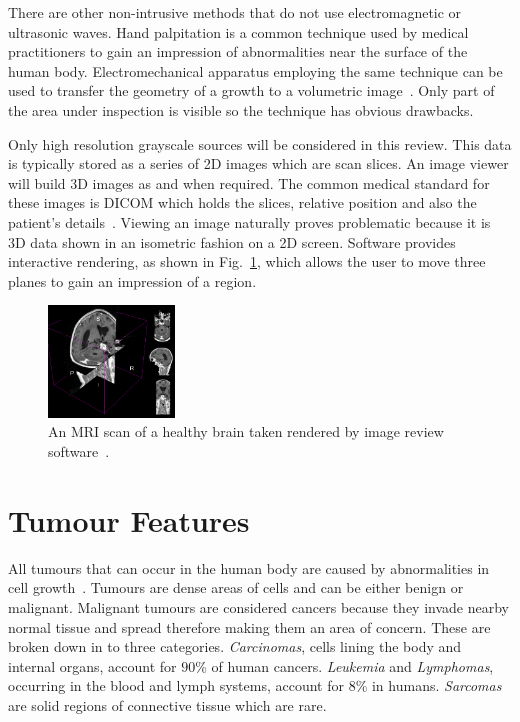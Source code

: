 \documentclass[journal]{IEEEtran}
\begin{document}
There are other non-intrusive methods that do not use electromagnetic or ultrasonic waves.
Hand palpitation is a common technique used by medical practitioners to gain an impression of abnormalities near the surface of the human body. 
Electromechanical apparatus employing the same technique can be used to transfer the geometry of a growth to a volumetric image~\cite{liu09haptic,wellman1997modeling}.  
Only part of the area under inspection is visible so the technique has obvious drawbacks.

Only high resolution grayscale sources will be considered in this review.
This data is typically stored as a series of 2D images which are scan slices.
An image viewer will build 3D images as and when required.
The common medical standard for these images is DICOM which holds the slices, relative position and also the patient's details~\cite{dicom11nema}.
Viewing an image naturally proves problematic because it is 3D data shown in an isometric fashion on a 2D screen.
Software provides interactive rendering, as shown in Fig.~\ref{fig:3d}, which allows the user to move three planes to gain an impression of a region.

\begin{figure}[!htb]
   \centering
   \includegraphics[width = 0.3\textwidth]{Figures/3Dview.png}
   \caption{An MRI scan of a healthy brain taken rendered by image review software~\cite{cia,slicer}.}
   \label{fig:3d}
\end{figure}












\section{Tumour Features}
\label{sec:tumour}

All tumours that can occur in the human body are caused by abnormalities in cell growth~\cite{cooper1992cancer}.
Tumours are dense areas of cells and can be either benign or malignant.
Malignant tumours are considered cancers because they invade nearby normal tissue and spread therefore making them an area of concern.
These are broken down in to three categories.
\emph{Carcinomas}, cells lining the body and internal organs, account for $90$\% of human cancers.
\emph{Leukemia} and \emph{Lymphomas}, occurring in the blood and lymph systems, account for $8$\% in humans.
\emph{Sarcomas} are solid regions of connective tissue which are rare.
\end{document}
